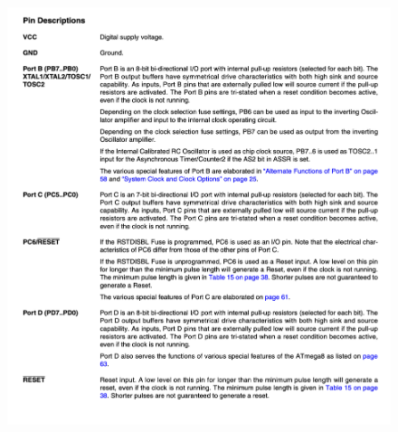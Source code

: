 \documentclass[14pt]{extreport}
\begin{document}
\begin{sloppypar}
\begin{figure}[ht]
	\includegraphics[width=\textwidth]{./images/atmega_dh2.png}
	\label{fig:atmega2}
\end{figure}



\end{sloppypar}
\end{document}
